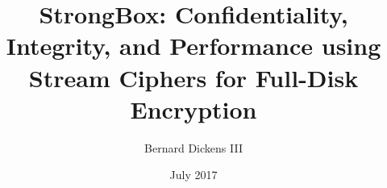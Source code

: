 \documentclass{ucetd}
\title{StrongBox: Confidentiality, Integrity, and Performance using Stream Ciphers for Full-Disk Encryption}
\author{Bernard Dickens III}
\date{July 2017}
\begin{document}
\maketitle

\makecopyright

\tableofcontents
\listoffigures
\listoftables





\mainmatter










\clearpage
\printbibliography

%
%
\end{document}
